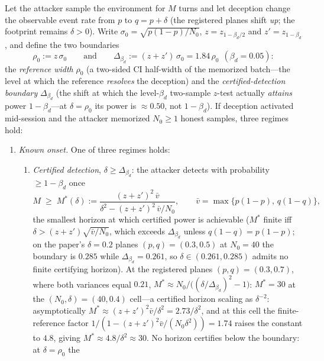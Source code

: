 \begin{theorem}\label{thm:onset}
Let the attacker sample the environment for $M$ turns and let deception
change the observable event rate from $p$ to $q=p+\delta$ (the registered
planes shift \emph{up}; the footprint remains $\delta>0$). Write
$\sigma_0=\sqrt{p(1-p)/N_0}$, $z=z_{1-\beta_d/2}$ and $z'=z_{1-\beta_d}$,
and define the two boundaries
\[
\rho_0:=z\,\sigma_0
\qquad\text{and}\qquad
\Delta_{\beta_d}:=(z+z')\,\sigma_0=1.84\,\rho_0\ \ (\beta_d=0.05):
\]
the \emph{reference width} $\rho_0$ (a two-sided CI half-width of the
memorized batch---the level at which the reference \emph{resolves} the
deception) and the \emph{certified-detection boundary} $\Delta_{\beta_d}$
(the shift at which the level-$\beta_d$ two-sample $z$-test actually
\emph{attains} power $1-\beta_d$---at $\delta=\rho_0$ its power is
$\approx0.50$, not $1-\beta_d$). If deception activated mid-session and
the attacker memorized $N_0\ge1$ honest samples, three regimes hold:
\begin{enumerate}[label=(\roman*),leftmargin=2em]
\item \emph{Known onset.} One of three regimes holds:
  \begin{enumerate}[label=(\alph*),leftmargin=2em]
  \item \emph{Certified detection}, $\delta\ge\Delta_{\beta_d}$: the
        attacker detects with probability $\ge1-\beta_d$ once
        \[
        M\;\ge\;M^{*}(\delta):=\frac{(z+z')^{2}\,\bar v}
        {\delta^{2}-(z+z')^{2}\,\bar v/N_0},
        \qquad \bar v=\max\{p(1-p),\,q(1-q)\},
        \]
        the smallest horizon at which certified power is achievable
        ($M^{*}$ finite iff $\delta>(z+z')\sqrt{\bar v/N_0}$,
        which exceeds $\Delta_{\beta_d}$ unless $q(1-q)=p(1-p)$; on the
        paper's $\delta=0.2$ planes $(p,q)=(0.3,0.5)$ at $N_0=40$ the
        boundary is $0.285$ while $\Delta_{\beta_d}=0.261$, so
        $\delta\in(0.261,0.285)$ admits no finite certifying horizon).
        At the registered planes $(p,q)=(0.3,0.7)$, where both variances equal $0.21$,
        $M^{*}\approx N_0/\bigl((\delta/\Delta_{\beta_d})^{2}-1\bigr)$:
        $M^{*}=30$ at the $(N_0,\delta)=(40,0.4)$ cell---a certified
        horizon scaling as $\delta^{-2}$: asymptotically
        $M^{*}\approx(z+z')^{2}\bar v/\delta^{2}=2.73/\delta^{2}$, and
        at this cell the finite-reference factor
        $1/(1-(z+z')^{2}\bar v/(N_0\delta^{2}))=1.74$ raises the constant
        to $4.8$, giving $M^{*}\approx4.8/\delta^{2}\approx30$. No
        horizon certifies below the boundary: at $\delta=\rho_0$ the

\end{enumerate}
\end{enumerate}
\end{theorem}
